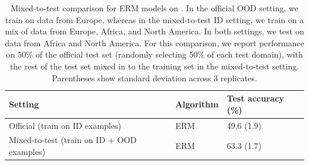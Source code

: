 \begin{table}[tbp]
    \caption{Mixed-to-test comparison for ERM models on \Wheat.
    In the official OOD setting, we train on data from Europe, whereas in the mixed-to-test ID setting, we train on a mix of data from Europe, Africa, and North America.
    In both settings, we test on data from Africa and North America.
    For this comparison, we report performance on 50\% of the official test set (randomly selecting 50\% of each test domain), with the rest of the test set mixed in to the training set in the mixed-to-test setting.
    Parentheses show standard deviation across 3 replicates.}
  \centering
  \begin{tabular}{lll}
  \toprule
  Setting & Algorithm & Test accuracy (\%) \\
  \midrule
  Official (train on ID examples)             & ERM & 49.6 (1.9) \\
  Mixed-to-test (train on ID + OOD examples)  & ERM & 63.3 (1.7) \\
  \bottomrule
  \end{tabular}
  \label{tab:wheat_ood}
\end{table}


